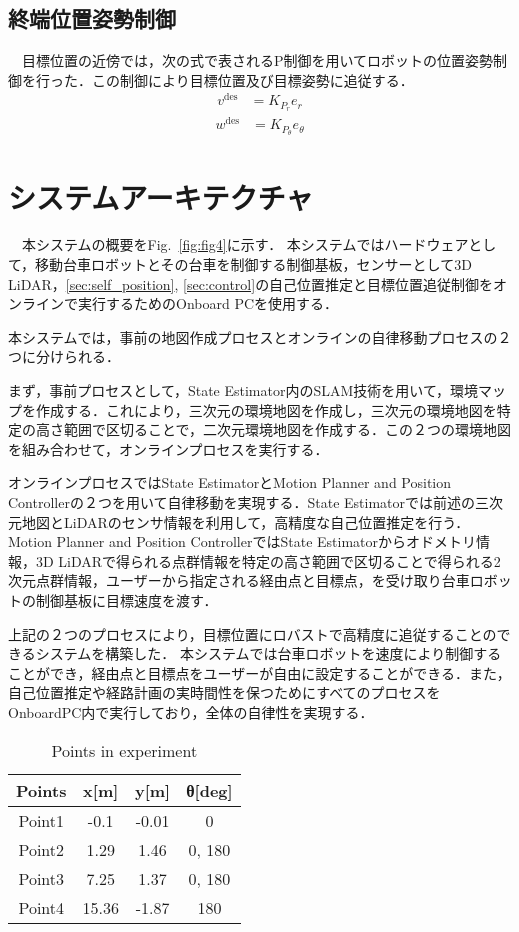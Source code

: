 \subsection{終端位置姿勢制御}
\label{subsec:pos_control}
　目標位置の近傍では，次の式で表されるP制御を用いてロボットの位置姿勢制御を行った．この制御により目標位置及び目標姿勢に追従する．
\begin{align}
v^{\text{des}} &= K_{P_{r}} e_{r}
\end{align}
\begin{align}
w^{\text{des}} &= K_{P_{θ}} e_{θ}
\end{align}

\section{システムアーキテクチャ}
　本システムの概要をFig.~\ref{fig:fig4}に示す．
本システムではハードウェアとして，移動台車ロボットとその台車を制御する制御基板，センサーとして3D LiDAR，\ref{sec:self_position}, \ref{sec:control}の自己位置推定と目標位置追従制御をオンラインで実行するためのOnboard PCを使用する．

本システムでは，事前の地図作成プロセスとオンラインの自律移動プロセスの２つに分けられる．

まず，事前プロセスとして，State Estimator内のSLAM技術を用いて，環境マップを作成する．これにより，三次元の環境地図を作成し，三次元の環境地図を特定の高さ範囲で区切ることで，二次元環境地図を作成する．この２つの環境地図を組み合わせて，オンラインプロセスを実行する．

オンラインプロセスではState EstimatorとMotion Planner and Position Controllerの２つを用いて自律移動を実現する．State Estimatorでは前述の三次元地図とLiDARのセンサ情報を利用して，高精度な自己位置推定を行う．Motion Planner and Position ControllerではState Estimatorからオドメトリ情報，3D LiDARで得られる点群情報を特定の高さ範囲で区切ることで得られる2次元点群情報，ユーザーから指定される経由点と目標点，を受け取り台車ロボットの制御基板に目標速度を渡す．

上記の２つのプロセスにより，目標位置にロバストで高精度に追従することのできるシステムを構築した．
本システムでは台車ロボットを速度により制御することができ，経由点と目標点をユーザーが自由に設定することができる．また，自己位置推定や経路計画の実時間性を保つためにすべてのプロセスをOnboardPC内で実行しており，全体の自律性を実現する．

\begin{table}[!t]
    \caption{Points in experiment}
    \label{table1}
    \centering
    \begin{tabular}{cccc} \hline
      Points & x[m] & y[m] & θ[deg]\\
      \hline \hline
      Point1 & -0.1 & -0.01 & 0\\
      Point2 & 1.29 & 1.46 & 0, 180\\
      Point3 & 7.25 & 1.37 & 0, 180\\
      Point4 & 15.36 & -1.87 & 180\\
      \hline
    \end{tabular}
\end{table}


